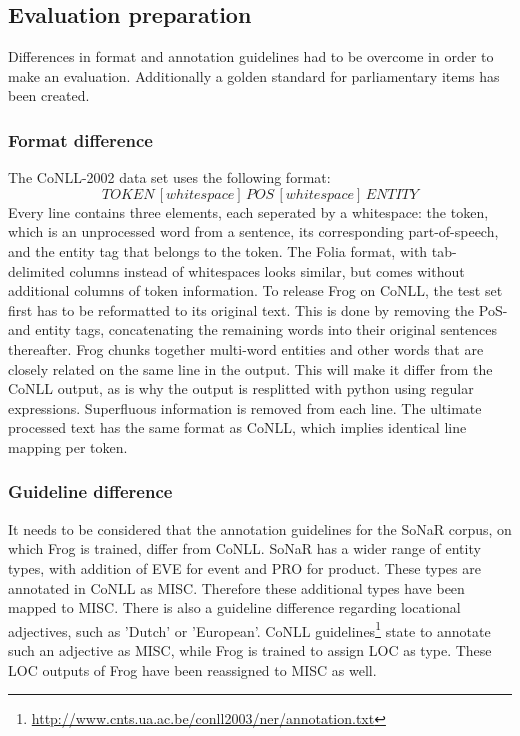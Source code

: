 \subsection{Evaluation preparation}\label{subsec:eval_prep}
Differences in format and annotation guidelines had to be overcome in order to make an evaluation. 
Additionally a golden standard for parliamentary items has been created.
\subsubsection{Format difference}
The CoNLL-2002 data set uses the following format: $$TOKEN\,[whitespace]\,POS\,[whitespace]\,ENTITY$$ Every line contains three elements, each seperated by a whitespace: the token, which is an unprocessed word from a sentence, its corresponding part-of-speech, and the entity tag that belongs to the token. The Folia format, with tab-delimited columns instead of whitespaces looks similar, but comes without additional columns of token information. To release Frog on CoNLL, the test set first has to be reformatted to its original text. This is done by removing the PoS- and entity tags, concatenating the remaining words into their original sentences thereafter.  Frog chunks together multi-word entities and other words that are closely related on the same line in the output. This will make it differ from the CoNLL output, as is why the output is resplitted with python using regular expressions. Superfluous information is removed from each line. The ultimate processed text has the same format as CoNLL, which implies identical line mapping per token.

\subsubsection{Guideline difference}
It needs to be considered that the annotation guidelines for the SoNaR corpus, on which Frog is trained, differ from CoNLL. SoNaR has a wider range of entity types, with addition of EVE for event and PRO for product. These types are annotated in CoNLL as MISC. Therefore these additional types have been mapped to MISC. There is also a guideline difference regarding locational adjectives, such as 'Dutch' or 'European'. CoNLL guidelines\footnote{\url{http://www.cnts.ua.ac.be/conll2003/ner/annotation.txt}} state to annotate such an adjective as MISC, while Frog is trained to assign LOC as type. These LOC outputs of Frog have been reassigned to MISC as well.

